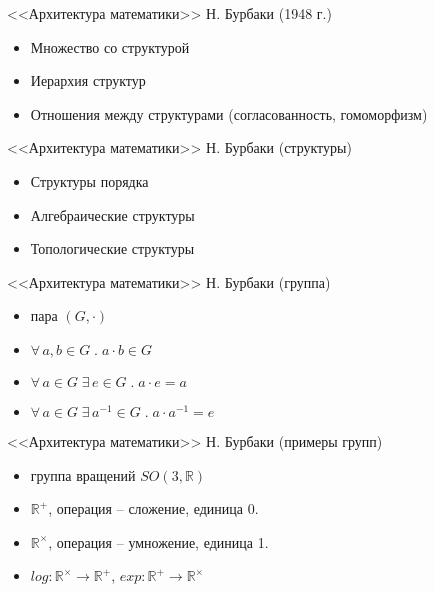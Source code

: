 \documentclass{beamer}
\begin{document}
\begin{frame}{<<Архитектура математики>> Н. Бурбаки (1948 г.)}
    \begin{itemize}
        \item Множество со структурой
        \item Иерархия структур
        \item Отношения между структурами (согласованность, гомоморфизм)
    \end{itemize}
\end{frame}

\begin{frame}{<<Архитектура математики>> Н. Бурбаки (структуры)}
    \begin{itemize}
        \item Структуры порядка
        \item Алгебраические структуры
        \item Топологические структуры
    \end{itemize}
\end{frame}

\begin{frame}{<<Архитектура математики>> Н. Бурбаки (группа)}
    \begin{itemize}
        \item пара $(G, \cdot)$ 
        \item $\forall \, a, b \in G \; . \; a \cdot b \in G$
        \item $\forall \, a \in G \; \exists \, e \in G \; . \; a \cdot e = a$
        \item $\forall \, a \in G \; \exists \, a^{-1} \in G \; . \; a \cdot a^{-1} = e$
    \end{itemize}
\end{frame}

\begin{frame}{<<Архитектура математики>> Н. Бурбаки (примеры групп)}
    \begin{itemize}
        \item группа вращений $SO(3, \mathbb{R})$ 
        \item $\mathbb{R}^+$, операция -- сложение, единица 0. 
        \item $\mathbb{R}^\times$, операция -- умножение, единица 1.
        \item $log : \mathbb{R}^\times \to \mathbb{R}^+$, $exp : \mathbb{R}^+ \to \mathbb{R}^\times $ 
    \end{itemize}
\end{frame}
\end{document}
